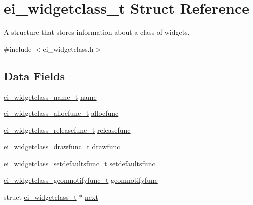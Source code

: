 \hypertarget{structei__widgetclass__t}{\section{ei\-\_\-widgetclass\-\_\-t Struct Reference}
\label{structei__widgetclass__t}
}


A structure that stores information about a class of widgets.  




{\ttfamily \#include $<$ei\-\_\-widgetclass.\-h$>$}

\subsection*{Data Fields}
\begin{DoxyCompactItemize}
\item 
\hyperlink{ei__widgetclass_8h_acfa18ebbfac8cbbc11345a01c2099aed}{ei\-\_\-widgetclass\-\_\-name\-\_\-t} \hyperlink{structei__widgetclass__t_aa5799b5999890cf04915bf0fe5151ec8}{name}
\item 
\hyperlink{ei__widgetclass_8h_a4c7f455367004f9a620df19123cdaab8}{ei\-\_\-widgetclass\-\_\-allocfunc\-\_\-t} \hyperlink{structei__widgetclass__t_a233446250cdde4347c1381427923d21a}{allocfunc}
\item 
\hyperlink{ei__widgetclass_8h_ac52af60159f39628ed8ed6b1d9af5493}{ei\-\_\-widgetclass\-\_\-releasefunc\-\_\-t} \hyperlink{structei__widgetclass__t_aebe6139b31816495e866c99ec3e83de6}{releasefunc}
\item 
\hyperlink{ei__widgetclass_8h_a72107c7b4e8a6d3f91d4a02e51cb3bd3}{ei\-\_\-widgetclass\-\_\-drawfunc\-\_\-t} \hyperlink{structei__widgetclass__t_a528168099a2a1515c4cf65400ccbfff2}{drawfunc}
\item 
\hyperlink{ei__widgetclass_8h_aa04d729c9dca14d3ac92c0f9aa8cc5cb}{ei\-\_\-widgetclass\-\_\-setdefaultsfunc\-\_\-t} \hyperlink{structei__widgetclass__t_a5fec706eefca10172d897cf61b268510}{setdefaultsfunc}
\item 
\hyperlink{ei__widgetclass_8h_a751dc2e4c264c3597fcc2d59878f6265}{ei\-\_\-widgetclass\-\_\-geomnotifyfunc\-\_\-t} \hyperlink{structei__widgetclass__t_aaf0aa3f54a48a6b3f8b8e12574ede4b7}{geomnotifyfunc}
\item 
struct \hyperlink{structei__widgetclass__t}{ei\-\_\-widgetclass\-\_\-t} $\ast$ \hyperlink{structei__widgetclass__t_aa184e650475ec2451f033858db1876f0}{next}
\end{DoxyCompactItemize}


